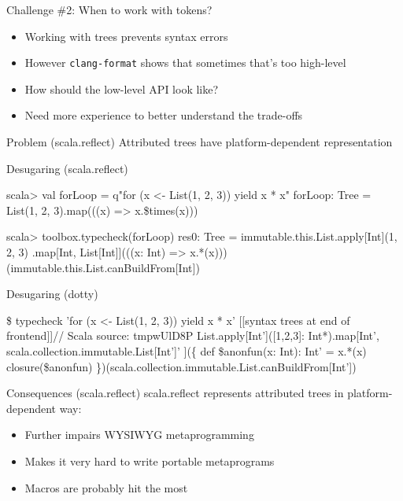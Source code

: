 \documentclass[svgnames,dvipsnames,hyperref={bookmarks=false},usepdftitle=false]{beamer}
\begin{document}
\begin{frame}{Challenge \#2: When to work with tokens?}
\begin{itemize}
\item Working with trees prevents syntax errors
\item However \texttt{clang-format} shows that sometimes that's too high-level
\item How should the low-level API look like?
\item Need more experience to better understand the trade-offs
\end{itemize}
\end{frame}


\begin{frame}{Problem (scala.reflect)}
Attributed trees have platform-dependent representation
\end{frame}

\begin{frame}[fragile]{Desugaring (scala.reflect)}
\begin{semiverbatim}
scala> val forLoop = q"for (x <- List(1, 2, 3)) yield x * x"
forLoop: Tree = List(1, 2, 3).map(((x) => x.\$times(x)))

scala> toolbox.typecheck(forLoop)
res0: Tree = \alert<1->{immutable.this.}List\alert<1->{.apply[Int]}(1, 2, 3)
.map\alert<1->{[Int, List[Int]]}(((x\alert<1->{: Int}) => x.*(x)))
\alert<1->{(immutable.this.List.canBuildFrom[Int])}

\end{semiverbatim}
\end{frame}

\begin{frame}[fragile]{Desugaring (dotty)}
\begin{semiverbatim}
\$ typecheck 'for (x <- List(1, 2, 3)) yield x * x'
[[syntax trees at end of frontend]]// Scala source: tmpwUlD8P
List\alert<1->{.apply[Int']}(\alert<1->{[}1,2,3\alert<1->{]: Int*}).map\alert<1->{[Int',
  scala.collection.immutable.List[Int']'
]}(\{
  \alert<1->{def \$anonfun(}x\alert<1->{: Int): Int' = }x.*(x)
  \alert<1->{closure(\$anonfun)}
\})\alert<1->{(scala.collection.immutable.List.canBuildFrom[Int'])}
\end{semiverbatim}
\end{frame}

\begin{frame}{Consequences (scala.reflect)}
scala.reflect represents attributed trees in platform-dependent way:
\begin{itemize}
\item Further impairs WYSIWYG metaprogramming
\item Makes it very hard to write portable metaprograms
\item Macros are probably hit the most
\end{itemize}
\end{frame}
\end{document}
